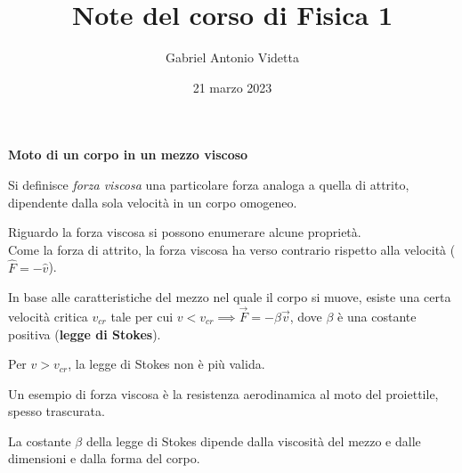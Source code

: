 \documentclass[11pt]{article}
\title{\textbf{Note del corso di Fisica 1}}
\author{Gabriel Antonio Videtta}
\date{21 marzo 2023}
\begin{document}
	
	\maketitle
	
	\begin{center}
		\Large \textbf{Moto di un corpo in un mezzo viscoso}
	\end{center}
	
	\begin{definition}
		Si definisce \textit{forza viscosa} una particolare
		forza analoga a quella di attrito, dipendente dalla sola velocità in
		un corpo omogeneo.
	\end{definition}
	
	\begin{remark} Riguardo la forza viscosa si possono
		enumerare alcune proprietà. \\
		
		\li Come la forza di attrito, la forza viscosa ha verso
		contrario rispetto alla velocità ($\hat{F} = -\hat{v}$).
		
		\li In base alle caratteristiche del mezzo nel quale il
		corpo si muove, esiste una certa velocità critica $v_{cr}$ tale
		per cui $v < v_{cr} \implies \Vec{F} = -\beta \Vec{v}$, dove
		$\beta$ è una costante positiva (\textbf{legge di Stokes}).
		
		\li Per $v > v_{cr}$, la legge di Stokes non è più valida.
	\end{remark}
	
	\begin{example}
		Un esempio di forza viscosa è la resistenza aerodinamica
		al moto del proiettile, spesso trascurata.
	\end{example}
	
	\begin{remark}
		La costante $\beta$ della legge di Stokes dipende dalla
		viscosità del mezzo e dalle dimensioni e dalla forma del
		corpo.
	\end{remark}
	
\end{document}
